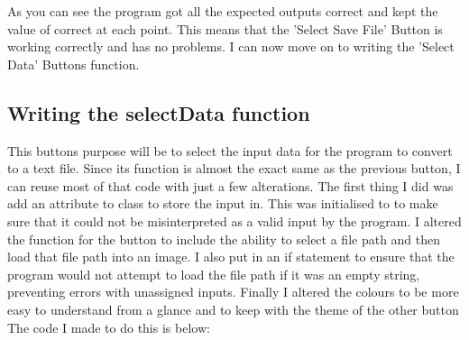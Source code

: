 \documentclass{report}
\begin{document}
\noindent As you can see the program got all the expected outputs correct and kept the value of  correct at each point. This means that the 'Select Save File' Button is working correctly and has no problems. I can now move on to writing the 'Select Data' Buttons function.
\subsection{Writing the selectData function}
This buttons purpose will be to select the input data for the program to convert to a text file. Since its function is almost the exact same as the previous button, I can reuse most of that code with just a few alterations. The first thing I did was add an attribute to class to store the input in. This was initialised to  to make sure that it could not be misinterpreted as a valid input by the program. I altered the function for the button to include the ability to select a file path and then load that file path into an image. I also put in an if statement to ensure that the program would not attempt to load the file path if it was an empty string, preventing errors with unassigned inputs. Finally I altered the colours to be more easy to understand from a glance and to keep with the theme of the other button
\newline
The code I made to do this is below:
\end{document}
